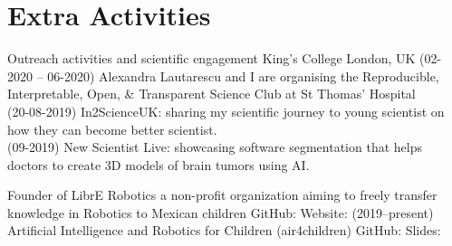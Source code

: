 \documentclass[10pt,a4paper,roman]{moderncv}
\begin{document}







\section{Extra Activities}




{Outreach activities and scientific engagement}
{King's College London, UK}
{}
{}
{
(02-2020 -- 06-2020) Alexandra Lautarescu and I are organising 
the Reproducible, Interpretable, Open, \& Transparent Science Club
at St Thomas' Hospital \\
(20-08-2019) In2ScienceUK: sharing my scientific journey to young
scientist on how they can become better scientist. \\
(09-2019) New Scientist Live: showcasing software segmentation
that helps doctors to create 3D models of brain tumors using AI.
}
{}







{Founder of LibrE Robotics}
{a non-profit organization aiming to freely transfer 
knowledge in Robotics to Mexican children}
{GitHub: \href{https://github.com/librerobotics}{\faGithubAlt} }
{Website: \href{https://sites.google.com/site/LibreRobotics/}{\faExternalLink}}
{(2019--present) Artificial Intelligence and Robotics for Children (air4children) 
GitHub: \href{https://github.com/librerobotics/air4children}{\faGithubAlt}
Slides: \href{https://github.com/librerobotics/air4children/blob/master/docs/slides/presentation.air4children.pdf}{\faFilePdfO} 
}
{}  
\end{document}
